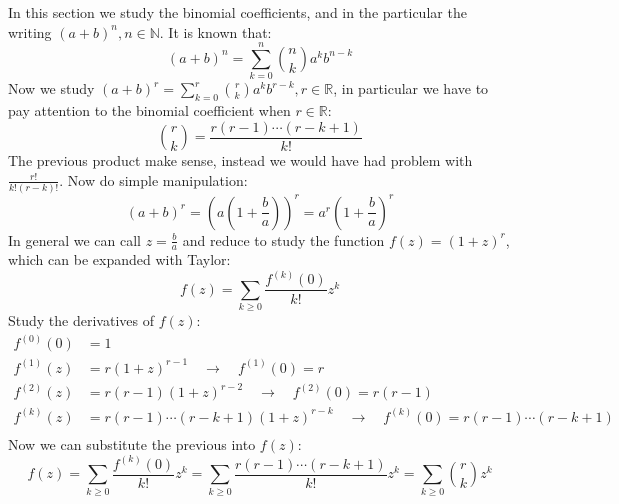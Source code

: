 In this section we study the binomial coefficients, and in the
particular the writing $(a + b)^n, n\in \mathbb{N}$. It is known that:
\begin{displaymath}
  (a+b)^n = \sum_{k=0}^{n}{{{n}\choose{k}}a^k b^{n-k} }
\end{displaymath}
Now we study $(a + b)^r = \sum_{k=0}^{r}{{{r}\choose{k}}a^k b^{r-k} },
r\in \mathbb{R}$, in particular we have to pay attention to the
binomial coefficient when $r\in \mathbb{R}$:
\begin{displaymath}
  {{r}\choose{k}}  = \frac{r(r-1)\cdots(r-k+1)}{k!}
\end{displaymath}
The previous product make sense, instead we would have had problem
with $ \frac{r!}{k!(r-k)!} $. Now do simple manipulation:
\begin{displaymath}
  (a+b)^r = \left( a\left(1 +  \frac{b}{a}\right)\right)^r =
  a^r \left(1 +  \frac{b}{a}\right)^r
\end{displaymath}
In general we can call $z= \frac{b}{a} $ and reduce to study the
function $f(z)=(1+z)^r$, which can be expanded with Taylor:
\begin{displaymath}
  f(z) = \sum_{k \geq 0}{ \frac{f^{(k)}(0)}{k!} z^k }
\end{displaymath}
Study the derivatives of $f(z)$:
\begin{displaymath}
  \begin{split}
    f^{(0)}(0) &= 1 \\
    f^{(1)}(z) &= r(1+z)^{r-1} \quad \rightarrow
    \quad f^{(1)}(0) =    r\\
    f^{(2)}(z) &= r(r-1)(1+z)^{r-2} \quad \rightarrow
    \quad f^{(2)}(0) = r(r-1)\\
    f^{(k)}(z) &= r(r-1)\cdots(r-k+1)(1+z)^{r-k}
    \quad \rightarrow \quad f^{(k)}(0) = r(r-1)\cdots(r-k+1)\\
  \end{split}
\end{displaymath}
Now we can substitute the previous into $f(z)$:
\begin{displaymath}
  f(z) = \sum_{k \geq 0}{ \frac{f^{(k)}(0)}{k!} z^k } =
  \sum_{k \geq 0}{ \frac{r(r-1)\cdots(r-k+1)}{k!} z^k } =
  \sum_{k \geq 0}{ {{r}\choose{k}} z^k }
\end{displaymath}

